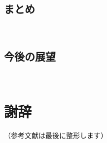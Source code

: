 \documentclass[12pt,a4j]{jreport}
\begin{document}
\section{まとめ}
~

\section{今後の展望}
~%
~

\chapter*{謝辞}

（参考文献は最後に整形します）



\end{document}
